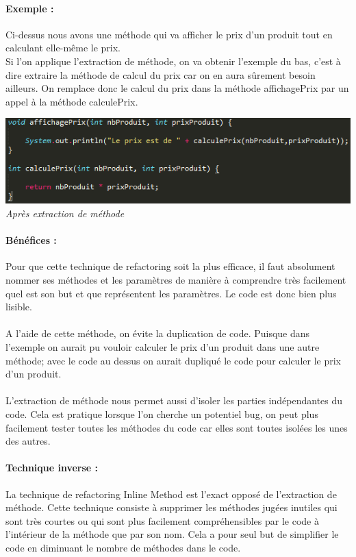 \documentclass[a4paper,twoside,12pt,openright]{report}
\begin{document}
\paragraph{Exemple :} 
Ci-dessus nous avons une méthode qui va afficher le prix d'un produit tout en calculant elle-même le prix.\\
Si l'on applique l'extraction de méthode, on va obtenir l'exemple du bas, c'est à dire extraire la méthode de calcul du prix car on en aura sûrement besoin ailleurs. On remplace donc le calcul du prix dans la méthode affichagePrix par un appel à la méthode calculePrix.\\
\begin{center}
\includegraphics[scale=1]{Image/Extraction_Methode2.png}\\
\itshape{Après extraction de méthode}
\end{center}
\paragraph{Bénéfices :}
Pour que cette technique de refactoring soit la plus efficace, il faut absolument nommer ses méthodes et les paramètres de manière à comprendre très facilement quel est son but et que représentent les paramètres. Le code est donc bien plus lisible.\\\\
A l'aide de cette méthode, on évite la duplication de code. Puisque dans l'exemple on aurait pu vouloir calculer le prix d'un produit dans une autre méthode; avec le code au dessus on aurait dupliqué le code pour calculer le prix d'un produit.\\\\
L'extraction de méthode nous permet aussi d'isoler les parties indépendantes du code. Cela est pratique lorsque l'on cherche un potentiel bug, on peut plus facilement tester toutes les méthodes du code car elles sont toutes isolées les unes des autres.

\paragraph{Technique inverse :}
La technique de refactoring Inline Method est l'exact opposé de l'extraction de méthode. Cette technique consiste à supprimer les méthodes jugées inutiles qui sont très courtes ou qui sont plus facilement compréhensibles par le code à l'intérieur de la méthode que par son nom. Cela a pour seul but de simplifier le code en diminuant le nombre de méthodes dans le code.\\
\end{document}
